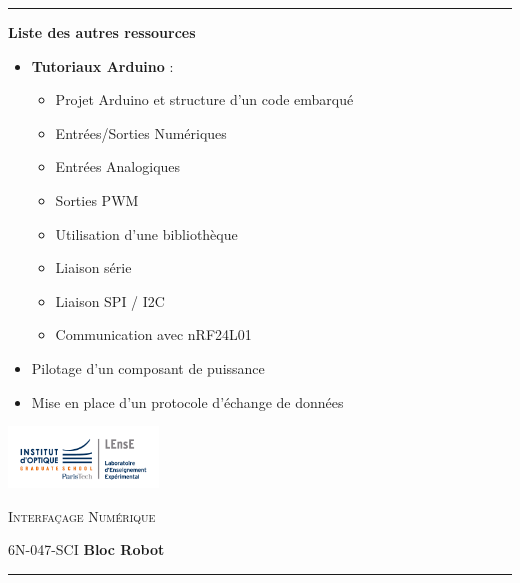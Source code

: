 \documentclass[a4paper,11pt,titlepage]{article} %
\begin{document}
\noindent \rule{\linewidth}{1pt}

\medskip

\textbf{\large Liste des autres ressources}
\begin{itemize}
	\item \textbf{Tutoriaux Arduino} :
	\begin{itemize}
		\item Projet Arduino et structure d'un code embarqué
		\item Entrées/Sorties Numériques
		\item Entrées Analogiques
		\item Sorties PWM
		\item Utilisation d'une bibliothèque
		\item Liaison série
		\item Liaison SPI / I2C
		\item Communication avec nRF24L01		
	\end{itemize}
	\item Pilotage d'un composant de puissance
	\item Mise en place d'un protocole d'échange de données
	
\end{itemize}


\newpage
\strut %
\begin{minipage}[c]{.25\linewidth}
	\includegraphics[width=4cm]{images/Logo-LEnsE.png}
\end{minipage} \hfill
\begin{minipage}[c]{.4\linewidth}

\begin{center}
\vspace{0.3cm}
{\Large \textsc{Interfaçage Numérique}}

\medskip

6N-047-SCI \qquad \textbf{\Large Bloc Robot}

\end{center}
\end{minipage}\hfill

\vspace{0.5cm}

\noindent \rule{\linewidth}{1pt}
\end{document}
